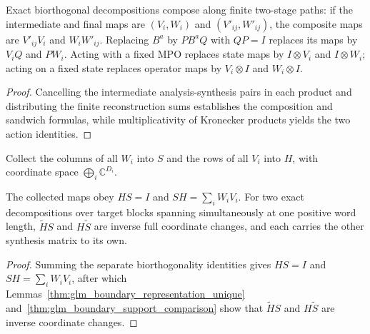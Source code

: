 \begin{lemma}
    \label{thm:glm_boundary_decomposition_operations}
    \leanok
    Exact biorthogonal decompositions compose along finite two-stage paths:
    if the intermediate and final maps are $(V_i,W_i)$ and
    $(V'_{ij},W'_{ij})$, the composite maps are
    $V'_{ij}V_i$ and $W_iW'_{ij}$. Replacing $B^a$ by $PB^aQ$ with
    $QP=I$ replaces its maps by $V_iQ$ and $PW_i$.
    Acting with a fixed MPO replaces state maps by $I\otimes V_i$ and
    $I\otimes W_i$; acting on a fixed state replaces operator maps by
    $V_i\otimes I$ and $W_i\otimes I$.
\end{lemma}
\begin{proof}
    \leanok
    Cancelling the intermediate analysis-synthesis pairs in each product and
    distributing the finite reconstruction sums establishes the composition
    and sandwich formulas, while multiplicativity of Kronecker products yields
    the two action identities.
\end{proof}

\begin{definition}
    \label{def:glm_boundary_full_coordinates}
    \leanok
    Collect the columns of all $W_i$ into $S$ and the rows of all $V_i$
    into $H$, with coordinate space $\bigoplus_i\mathbb C^{D_i}$.
\end{definition}

\begin{lemma}
    \label{thm:glm_boundary_full_comparison}
    \leanok
    The collected maps obey $HS=I$ and $SH=\sum_iW_iV_i$.
    For two exact decompositions over target blocks spanning simultaneously at one positive word length,
    $\widetilde HS$ and $H\widetilde S$ are inverse full coordinate changes,
    and each carries the other synthesis matrix to its own.
\end{lemma}
\begin{proof}
    \leanok
    Summing the separate biorthogonality identities gives $HS=I$ and
    $SH=\sum_iW_iV_i$, after which
    Lemmas~\ref{thm:glm_boundary_representation_unique}
    and~\ref{thm:glm_boundary_support_comparison} show that $\widetilde HS$
    and $H\widetilde S$ are inverse coordinate changes.
\end{proof}

